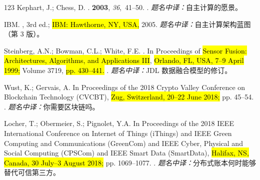\begin{thebibliography}{123}
Kephart, J.; Chess, D.
.
 {\bf 2003}, {\em 36},~41--50.
.
\newblock \textit{题名中译：}自主计算的愿景。

{IBM}.
, 3rd ed.; \hl{IBM: Hawthorne, NY, USA, }
  2005.
\newblock \textit{题名中译：}自主计算架构蓝图（第 3 版）。

Steinberg, A.N.; Bowman, C.L.; White, F.E.
.
\newblock In Proceedings of \hl{Sensor Fusion: Architectures, Algorithms, and Applications III}, \hl{Orlando, FL, USA, 7--9 April 1999;} Volume 3719, \hl{pp. 430--441.}
.
\newblock \textit{题名中译：}JDL 数据融合模型的修订。

Wust, K.; Gervais, A.
\newblock In Proceedings of the 2018 Crypto Valley Conference on Blockchain
  Technology (CVCBT), \hl{Zug, Switzerland, 20--22 June 2018;} pp. 45--54.
.
\newblock \textit{题名中译：}你需要区块链吗。

Locher, T.; Obermeier, S.; Pignolet, Y.A.
\newblock In Proceedings of the 2018 IEEE International Conference on Internet
  of Things (iThings) and IEEE Green Computing and Communications (GreenCom)
  and IEEE Cyber, Physical and Social Computing (CPSCom) and IEEE Smart Data
  (SmartData), \hl{Halifax, NS, Canada, 30 July–3 August 2018;} pp. 1069--1077.
.
\newblock \textit{题名中译：}分布式账本何时能够替代可信第三方。


\end{thebibliography}
